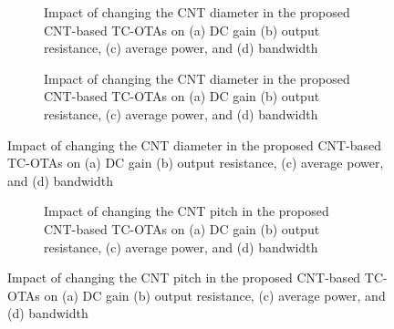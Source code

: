 \begin{figure}[htbp]
  \centering
  \begin{subfigure}[b]{0.48\linewidth}
    \centering
    \caption{Impact of changing the CNT diameter in the proposed CNT-based TC-OTAs on (a) DC gain (b) output resistance, (c) average power, and (d) bandwidth}

  \end{subfigure}
  \hfill
  \begin{subfigure}[b]{0.48\linewidth}
    \centering
    \caption{Impact of changing the CNT diameter in the proposed CNT-based TC-OTAs on (a) DC gain (b) output resistance, (c) average power, and (d) bandwidth}

  \end{subfigure}
  \caption{Impact of changing the CNT diameter in the proposed CNT-based TC-OTAs on (a) DC gain (b) output resistance, (c) average power, and (d) bandwidth}

  \label{fig:group_7084h}
\end{figure}

\begin{figure}[htbp]
  \centering
  \begin{subfigure}[b]{0.48\linewidth}
    \centering
  \end{subfigure}
  \hfill
  \begin{subfigure}[b]{0.48\linewidth}
    \centering
    \caption{Impact of changing the CNT pitch in the proposed CNT-based TC-OTAs on (a) DC gain (b) output resistance, (c) average power, and (d) bandwidth}

  \end{subfigure}
  \caption{Impact of changing the CNT pitch in the proposed CNT-based TC-OTAs on (a) DC gain (b) output resistance, (c) average power, and (d) bandwidth}

  \label{fig:group_2ewis}
\end{figure}


